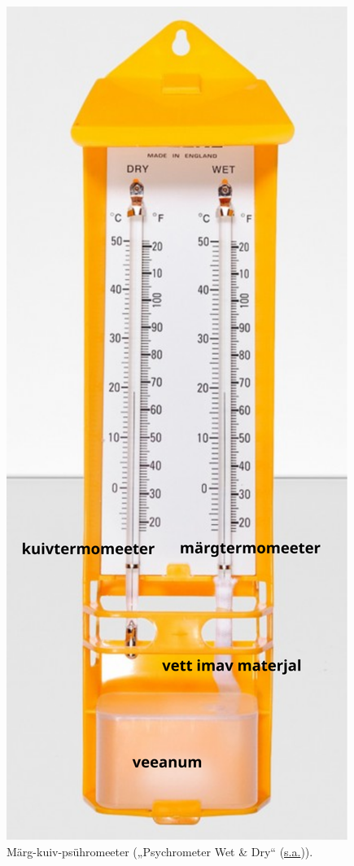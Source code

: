 \documentclass[
  12pt,
  a4paper,
  onecolumn, twoside]{article}
\begin{document}
\begin{figure}

{\centering \includegraphics[width=\textwidth,height=0.96\textheight,keepaspectratio=true]{wet-dry-psychrometer} 

}

\caption{Märg-kuiv-psühromeeter ({„Psychrometer Wet \& Dry``} (\protect\hyperlink{ref-psychrometer}{s.a.})).}\label{fig:wet-dry-psychrometer}
\end{figure}
\end{document}
